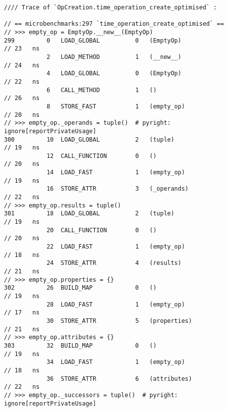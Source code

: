 \vspace{2em}
\begin{code}
    \begin{verbatim}
//// Trace of `OpCreation.time_operation_create_optimised` :

// == microbenchmarks:297 `time_operation_create_optimised` ==
// >>> empty_op = EmptyOp.__new__(EmptyOp)
299         0   LOAD_GLOBAL          0   (EmptyOp)                                          // 23   ns
            2   LOAD_METHOD          1   (__new__)                                          // 24   ns
            4   LOAD_GLOBAL          0   (EmptyOp)                                          // 22   ns
            6   CALL_METHOD          1   ()                                                 // 26   ns
            8   STORE_FAST           1   (empty_op)                                         // 20   ns
// >>> empty_op._operands = tuple()  # pyright: ignore[reportPrivateUsage]
300         10  LOAD_GLOBAL          2   (tuple)                                            // 19   ns
            12  CALL_FUNCTION        0   ()                                                 // 20   ns
            14  LOAD_FAST            1   (empty_op)                                         // 19   ns
            16  STORE_ATTR           3   (_operands)                                        // 22   ns
// >>> empty_op.results = tuple()
301         18  LOAD_GLOBAL          2   (tuple)                                            // 19   ns
            20  CALL_FUNCTION        0   ()                                                 // 20   ns
            22  LOAD_FAST            1   (empty_op)                                         // 18   ns
            24  STORE_ATTR           4   (results)                                          // 21   ns
// >>> empty_op.properties = {}
302         26  BUILD_MAP            0   ()                                                 // 19   ns
            28  LOAD_FAST            1   (empty_op)                                         // 17   ns
            30  STORE_ATTR           5   (properties)                                       // 21   ns
// >>> empty_op.attributes = {}
303         32  BUILD_MAP            0   ()                                                 // 19   ns
            34  LOAD_FAST            1   (empty_op)                                         // 18   ns
            36  STORE_ATTR           6   (attributes)                                       // 22   ns
// >>> empty_op._successors = tuple()  # pyright: ignore[reportPrivateUsage]

\end{verbatim}
\end{code}
